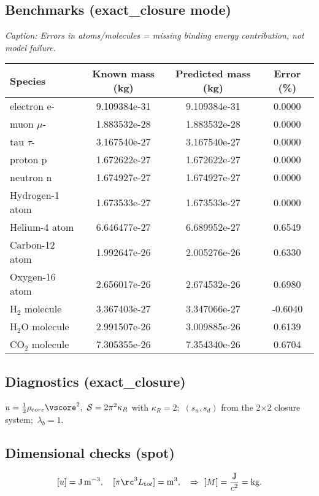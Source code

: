 \documentclass[11pt]{article}
\begin{document}
    \subsection*{Benchmarks (exact\_closure mode)}
        \emph{Caption: Errors in atoms/molecules = missing binding energy contribution, not model failure.}
        \begin{center}
        \begin{tabular}{lccc}
        \toprule
        Species & Known mass (kg) & Predicted mass (kg) & Error (\%)\\
        \midrule
        electron e- & 9.109384e-31 & 9.109384e-31 & 0.0000\\
        muon $\mu$- & 1.883532e-28 & 1.883532e-28 & 0.0000\\
        tau $\tau$- & 3.167540e-27 & 3.167540e-27 & 0.0000\\
        proton p & 1.672622e-27 & 1.672622e-27 & 0.0000\\
        neutron n & 1.674927e-27 & 1.674927e-27 & 0.0000\\
        Hydrogen-1 atom & 1.673533e-27 & 1.673533e-27 & 0.0000\\
        Helium-4 atom & 6.646477e-27 & 6.689952e-27 & 0.6549\\
        Carbon-12 atom & 1.992647e-26 & 2.005276e-26 & 0.6330\\
        Oxygen-16 atom & 2.656017e-26 & 2.674532e-26 & 0.6980\\
        H$_2$ molecule & 3.367403e-27 & 3.347066e-27 & -0.6040\\
        H$_2$O molecule & 2.991507e-26 & 3.009885e-26 & 0.6139\\
        CO$_2$ molecule & 7.305355e-26 & 7.354340e-26 & 0.6704\\
        \bottomrule
        \end{tabular}
        \end{center}

    \subsection*{Diagnostics (exact\_closure)}
        $u=\tfrac12\rho_{\textrm core}\vscore^2,\ \mathcal S=2\pi^2\kappa_R$ with $\kappa_R=2$;\
        $(s_u,s_d)$ from the 2$\times$2 closure system;\
        $\lambda_b=1$.

    \subsection*{Dimensional checks (spot)}
        \[
            [u]=\mathrm{J\,m^{-3}},\quad [\pi \rc^3 L_{\textrm tot}] = \mathrm{m^3},\quad
            \Rightarrow\ [M] = \frac{\mathrm{J}}{c^2}=\mathrm{kg}.
        \]
\end{document}
